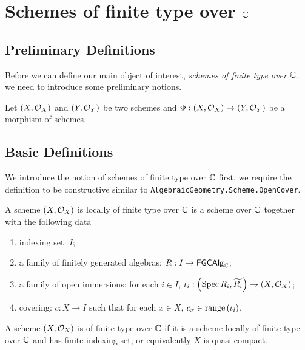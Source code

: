 \chapter{Schemes of finite type over $\mathbb{C}$}

\section{Preliminary Definitions}

Before we can define our main object of interest, {\em schemes of finite type over $\mathbb{C}$}, we need to introduce some preliminary notions.

\begin{definition}
Let $\left(X, \mathcal{O}_{X}\right)$ and $\left(Y, \mathcal{O}_{Y}\right)$ be two schemes and $\Phi : \left(X, \mathcal{O}_{X}\right) \to \left(Y, \mathcal{O}_{Y}\right)$ be a morphism of schemes.
\end{definition}

\section{Basic Definitions}

We introduce the notion of schemes of finite type over $\mathbb{C}$ first, we require the definition to be constructive similar
to {\tt AlgebraicGeometry.Scheme.OpenCover}.

\begin{definition}\label{def:SchemeLocallyOfFiniteType}
  A scheme $\left(X, \mathcal{O}_{X}\right)$ is locally of finite type over $\mathbb{C}$ is a scheme over $\mathbb{C}$ together
  with the following data
    \begin{enumerate}
        \item indexing set: $I$;
        \item a family of finitely generated algebras: $R : I \to \mathsf{FGCAlg}_{\mathbb{C}}$;
        \item a family of open immersions: for each $i \in I$, $\iota_i: \left(\operatorname*{Spec}{R_i}, \widetilde{R_i}\right) \to \left(X, \mathcal{O}_{X}\right)$;
        \item covering: $c : X \to I$ such that for each $x \in X$, $c_x \in \operatorname*{range}\left({\iota_i}\right)$.
    \end{enumerate}
\end{definition}


\begin{definition}\label{def:SchemeOfFiniteType}
  A scheme $\left(X, \mathcal{O}_{X}\right)$ is of finite type over $\mathbb{C}$ if it is a scheme locally of finite type over $\mathbb{C}$
  and has finite indexing set; or equivalently $X$ is quasi-compact.
\end{definition}

